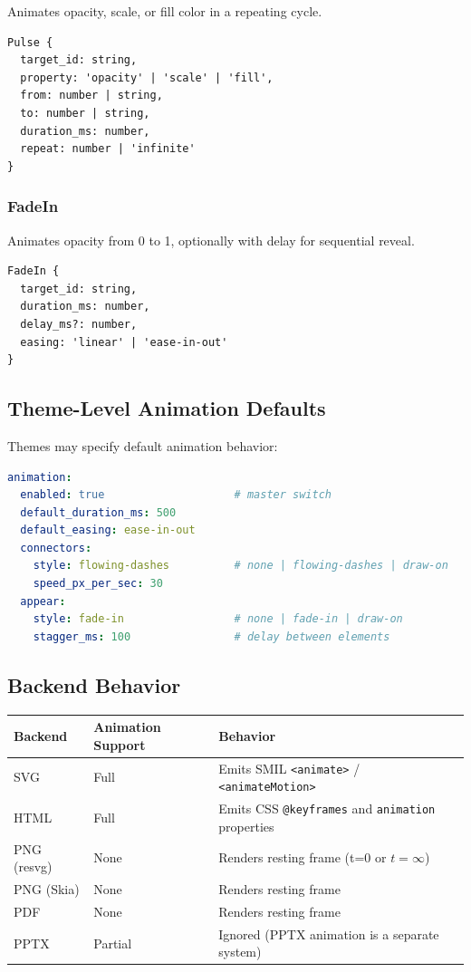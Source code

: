 Animates opacity, scale, or fill color in a repeating cycle.

\begin{Verbatim}[frame=single,fontsize=\small]
Pulse {
  target_id: string,
  property: 'opacity' | 'scale' | 'fill',
  from: number | string,
  to: number | string,
  duration_ms: number,
  repeat: number | 'infinite'
}
\end{Verbatim}

\subsubsection{FadeIn}

Animates opacity from 0 to 1, optionally with delay for sequential reveal.

\begin{Verbatim}[frame=single,fontsize=\small]
FadeIn {
  target_id: string,
  duration_ms: number,
  delay_ms?: number,
  easing: 'linear' | 'ease-in-out'
}
\end{Verbatim}

\subsection{Theme-Level Animation Defaults}

Themes may specify default animation behavior:

\begin{lstlisting}[language=yaml,caption={Theme animation configuration}]
animation:
  enabled: true                    # master switch
  default_duration_ms: 500
  default_easing: ease-in-out
  connectors:
    style: flowing-dashes          # none | flowing-dashes | draw-on
    speed_px_per_sec: 30
  appear:
    style: fade-in                 # none | fade-in | draw-on
    stagger_ms: 100                # delay between elements
\end{lstlisting}

\subsection{Backend Behavior}

\begin{center}
\small
\begin{tabular}{lll}
\toprule
\textbf{Backend} & \textbf{Animation Support} & \textbf{Behavior} \\
\midrule
SVG & Full & Emits SMIL \texttt{<animate>} / \texttt{<animateMotion>} \\
HTML & Full & Emits CSS \texttt{@keyframes} and \texttt{animation} properties \\
PNG (resvg) & None & Renders resting frame (t=0 or $t=\infty$) \\
PNG (Skia) & None & Renders resting frame \\
PDF & None & Renders resting frame \\
PPTX & Partial & Ignored (PPTX animation is a separate system) \\
\bottomrule
\end{tabular}
\end{center}

